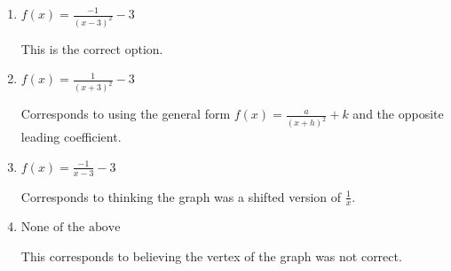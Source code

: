 \documentclass{extbook}[14pt]
\begin{document}
\begin{enumerate}
{\begin{enumerate}[label=\Alph*.]
Corresponds to thinking the graph was a shifted version of $\frac{1}{x}$, using the general form $f(x) = \frac{a}{(x+h)^2}+k$, and the opposite leading coefficient.
\item \( f(x) = \frac{-1}{(x - 3)^2} - 3 \)

This is the correct option.
\item \( f(x) = \frac{1}{(x + 3)^2} - 3 \)

Corresponds to using the general form $f(x) = \frac{a}{(x+h)^2}+k$ and the opposite leading coefficient.
\item \( f(x) = \frac{-1}{x - 3} - 3 \)

Corresponds to thinking the graph was a shifted version of $\frac{1}{x}$.
\item \( \text{None of the above} \)

This corresponds to believing the vertex of the graph was not correct.
\end{enumerate}

}
\end{enumerate}
\end{document}
